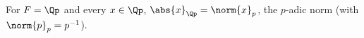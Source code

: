 For $F=\Qp$ and every $x\in\Qp$, $\abs{x}_{\Qp}=\norm{x}_p$, the $p$-adic norm (with $\norm{p}_p=p^{-1}$).
